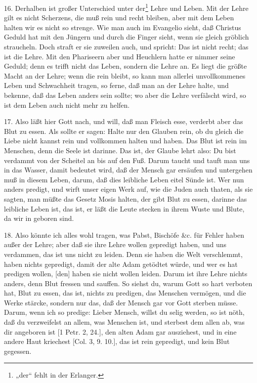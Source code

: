 16. Derhalben ist großer Unterschied unter der\footnote{„der“ fehlt in der Erlanger.} Lehre und Leben. Mit der Lehre gilt es nicht Scherzens, die muß rein und recht bleiben, aber mit dem Leben halten wir es nicht so strenge. Wie man auch im Evangelio sieht, daß Christus Geduld hat mit den Jüngern und durch die Finger sieht, wenn sie gleich gröblich straucheln. Doch straft er sie zuweilen auch, und spricht: Das ist nicht recht; das ist die Lehre. Mit den Phariseern aber und Heuchlern
hatte er nimmer seine Geduld; denn es trifft nicht das Leben, sondern die Lehre an. Es liegt die größte Macht an der Lehre; wenn die rein bleibt, so kann man allerlei unvollkommenes Leben und Schwachheit tragen, so ferne, daß man an der Lehre halte, und bekenne, daß das Leben anders sein sollte; wo aber die Lehre verfälscht wird, so ist dem Leben auch nicht mehr zu helfen.

17. Also läßt hier Gott nach, und will, daß man Fleisch esse, verderbt aber das Blut zu essen. Als sollte er sagen: Halte nur den Glauben rein, ob du gleich die Liebe nicht kannst rein und vollkommen halten und haben. Das Blut ist rein im Menschen, denn die Seele ist darinne. Das ist, der Glaube lehrt also: Du bist verdammt von der Scheitel an bis auf den Fuß. Darum taucht und tauft man uns in das Wasser, damit bedeutet wird, daß der Mensch gar ersäufen und untergehen muß in diesem Leben, darum, daß dies leibliche Leben eitel Sünde ist. Wer nun anders predigt, und wirft unser eigen Werk auf, wie die Juden auch thaten, als sie sagten, man müßte das Gesetz Mosis halten, der gibt Blut zu essen, darinne das leibliche Leben ist, das ist, er läßt die Leute stecken in ihrem Wuste und Blute, da wir in geboren sind.

18. Also könnte ich alles wohl tragen, was Pabst, Bischöfe \&c. für Fehler haben außer der Lehre; aber daß sie ihre Lehre wollen gepredigt haben, und uns verdammen, das ist uns nicht zu leiden. Denn sie haben die Welt verschlemmt, haben nichts gepredigt, damit der alte Adam getödtet würde, und wer es hat predigen wollen, [den] haben sie nicht wollen leiden. Darum ist ihre Lehre nichts anders, denn Blut fressen und sauffen. So siehst du, warum Gott so hart verboten hat, Blut zu essen, das ist, nichts zu predigen, das Menschen vermögen, und die Werke stärcke, sondern nur das, daß der Mensch gar vor Gott sterben müsse. Darum, wenn ich so predige: Lieber Mensch, willst du selig werden, so ist nöth, daß du verzweifelst an allem, was Menschen ist, und sterbest dem allen ab, was dir angeboren ist [1 Petr. 2, 24.], den alten Adam gar ausziehest, und in eine andere Haut kriechest [Col. 3, 9. 10.], das ist rein gepredigt, und kein Blut gegessen.

